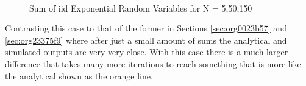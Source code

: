 \documentclass[a4paper, 11pt]{article}
\begin{document}
\pagebreak
\begin{figure}
    \centering
     \\
\caption{\label{fig:ExpSubFig}Sum of iid Exponential Random Variables for N = 5,50,150}
\end{figure}

\medskip
\noindent
Contrasting this case to that of the former in Sections \ref{sec:org0023b57} and \ref{sec:org23375f9} where after just a small amount of sums the analytical and simulated outputs are very very close.
With this case there is a much larger difference that takes many more iterations to reach something that is more like the analytical shown as the orange line.
\end{document}
